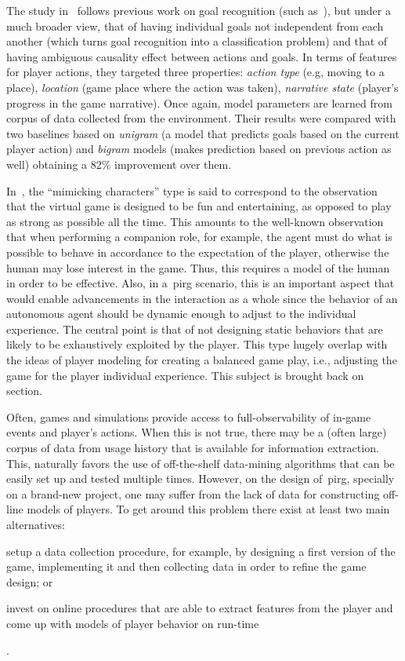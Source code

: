 The study in~\cite{ha_goal_2011} follows previous work on goal recognition (such as~\cite{mott_probabilistic_2006}), but under a much broader view, that of having individual goals not independent from each another (which turns goal recognition into a classification problem) and that of having ambiguous causality effect between actions and goals. In terms of features for player actions, they targeted three properties: \textit{action type} (e.g, moving to a place), \textit{location} (game place where the action was taken), \textit{narrative state} (player's progress in the game narrative).  Once again, model parameters are learned from corpus of data collected from the environment. Their results were compared with two baselines based on \textit{unigram} (a model that predicts goals based on the current player action) and \textit{bigram} models (makes prediction based on previous action as well) obtaining a 82\% improvement over them.

In~\cite{herik_opponent_2005}, the ``mimicking characters'' type is said to correspond to the observation that the virtual game is designed to be fun and entertaining, as opposed to play as strong as possible all the time. This amounts to the well-known observation that when performing a companion role, for example, the agent must do what is possible to behave in accordance to the expectation of the player, otherwise the human may lose interest in the game. Thus, this requires a model of the human in order to be effective. Also, in a~\gls{pirg} scenario, this is an important aspect that would enable advancements in the interaction as a whole since the behavior of an autonomous agent should be dynamic enough to adjust to the individual experience. The central point is that of not designing static behaviors that are likely to be exhaustively exploited by the player. This type hugely overlap with the ideas of player modeling for creating a balanced game play, i.e., adjusting the game for the player individual experience. This subject is brought back on section.  

Often, games and simulations provide access to full-observability of in-game events and player's actions. When this is not true, there may be a (often large) corpus of data from usage history that is available for information extraction. This, naturally favors the use of off-the-shelf data-mining algorithms that can be easily set up and tested multiple times. However, on the design of~\gls{pirg}, specially on a brand-new project, one may suffer from the lack of data for constructing off-line models of players. To get around this problem there exist at least two main alternatives: \begin{inparaenum}\item setup a data collection procedure, for example, by designing a first version of the game, implementing it and then collecting data in order to refine the game design; or \item invest on online procedures that are able to extract features from the player and come up with models of player behavior on run-time\end{inparaenum}.

